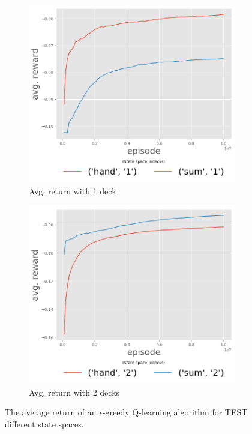 \begin{figure}[htp]
\centering
 \begin{subfigure}[b]{0.48\textwidth}
  	 \includegraphics[width=\textwidth]{./figures/avgReturnEp_ndeck1.png}
   \caption{Avg. return with 1 deck\label{sfig:3Dfignd6}}
 \end{subfigure}
 \begin{subfigure}[b]{0.48\textwidth}
  	 \includegraphics[width=\textwidth]{./figures/avgReturnEp_ndeck2.png}
   \caption{Avg. return with 2 decks\label{sfig:3Dfignd8}}
 \end{subfigure}
\caption{The average return of an $\epsilon$-greedy Q-learning algorithm for TEST different state spaces. \label{fig:q_vals_states}}
\end{figure}